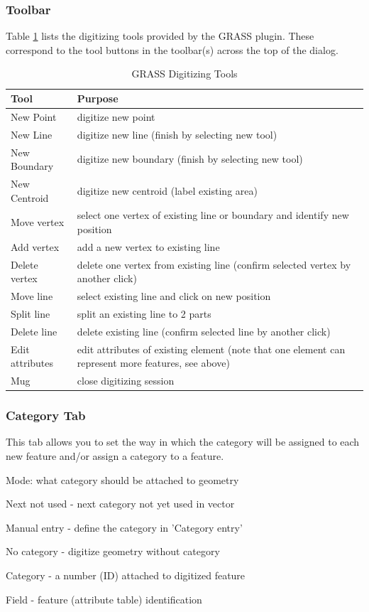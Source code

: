 \subsubsection{Toolbar}
Table \ref{tab:grass_tools} lists the digitizing tools provided by the GRASS plugin. These correspond to the tool buttons in the toolbar(s) across the top of the dialog.
\begin{table}[h]

\centering
\caption{GRASS Digitizing Tools}\label{tab:grass_tools}\medskip
 \begin{tabular}{|l|p{5in}|}
 \hline \textbf{Tool} & \textbf{Purpose} \\
\hline New Point & digitize new point \\
\hline New Line &  digitize new line (finish by selecting new tool) \\
\hline New Boundary & digitize new boundary (finish by selecting new tool)\\
\hline New Centroid & digitize new centroid (label existing area)\\
\hline Move vertex & select one vertex of existing line or boundary and identify new position\\
\hline Add vertex & add a new vertex to existing line\\
\hline Delete vertex & delete one vertex from existing line (confirm selected vertex by another click)\\
\hline Move line & select existing line and click on new position\\
\hline Split line & split an existing line to 2 parts\\
\hline Delete line & delete existing line (confirm selected line by another click)\\
\hline Edit attributes & edit attributes of existing element (note that one element can represent more features, see above)\\
\hline Mug & close digitizing session\\
\hline
\end{tabular}
\end{table}
\subsubsection{Category Tab}
This tab allows you to set the way in which the category will be assigned to each new feature and/or assign a category to a feature.
\begin{compactitem}
\item Mode: what category should be attached to geometry
\begin{compactitem}
\item Next not used - next category not yet used in vector
\item Manual entry - define the category in 'Category entry'
\item No category - digitize geometry without category
\end{compactitem}
\item Category - a number (ID) attached to digitized feature
\item Field - feature (attribute table) identification
\end{compactitem}
